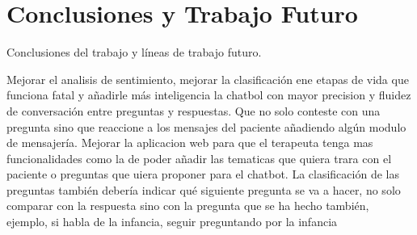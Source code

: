 \chapter{Conclusiones y Trabajo Futuro}
\label{cap:conclusiones}

Conclusiones del trabajo y líneas de trabajo futuro.


Mejorar el analisis de sentimiento, mejorar la clasificación ene etapas de vida que funciona fatal y añadirle más inteligencia la chatbol con mayor precision y fluidez de conversación entre preguntas y respuestas. Que no solo conteste con una pregunta sino que reaccione a los mensajes del paciente añadiendo algún modulo de mensajería. Mejorar la aplicacion web para que el terapeuta tenga mas funcionalidades como la de poder añadir las tematicas que quiera trara con el paciente o preguntas que uiera proponer para el chatbot. La clasificación de las preguntas también debería indicar qué siguiente pregunta se va a hacer, no solo comparar con la respuesta sino con la pregunta que se ha hecho también, ejemplo, si habla de la infancia, seguir preguntando por la infancia
